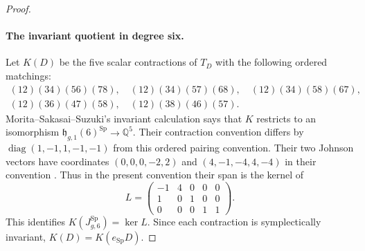 \documentclass[11pt]{article}
\theoremstyle{definition}\newtheorem{definition}[theorem]{Definition}
\begin{document}
\begin{proof}
\paragraph{The invariant quotient in degree six.}
Let $K(D)$ be the five scalar contractions of $T_D$
with the following ordered matchings:
\[
\begin{gathered}
(12)(34)(56)(78),\quad(12)(34)(57)(68),\quad
(12)(34)(58)(67),\\
(12)(36)(47)(58),\quad(12)(38)(46)(57).
\end{gathered}
\]
Morita--Sakasai--Suzuki's invariant calculation
\cite[Proposition~7.2, author pp.~26--27]{MSS2015}
says that $K$ restricts to an isomorphism
$\mathfrak h_{g,1}(6)^{\operatorname{Sp}}\to\mathbb Q^5$.
Their contraction convention differs by
$\operatorname{diag}(1,-1,1,-1,-1)$ from this ordered
pairing convention. Their two Johnson vectors have
coordinates $(0,0,0,-2,2)$ and $(4,-1,-4,4,-4)$
in their convention
\cite[proof of Theorem~7.5(i), author pp.~28--29]{MSS2015}.
Thus in the present convention their span is the kernel of
\[
 L=\begin{pmatrix}-1&4&0&0&0\\1&0&1&0&0\\0&0&0&1&1\end{pmatrix}.
\]
This identifies $K(J_{g,6}^{\operatorname{Sp}})=\ker L$.
Since each contraction is symplectically invariant,
$K(D)=K(e_{\operatorname{Sp}}D)$.


\end{proof}
\end{document}
